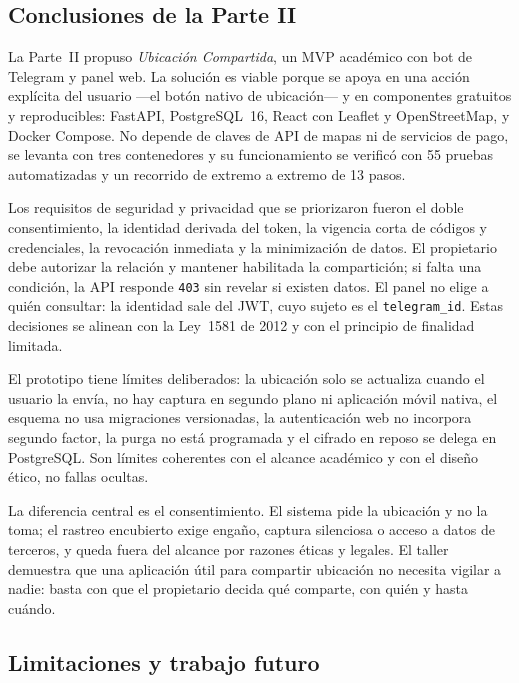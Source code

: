 \subsection{Conclusiones de la Parte II}

La Parte~II propuso \emph{Ubicación Compartida}, un MVP académico con bot de Telegram y panel web. La solución es viable porque se apoya en una acción explícita del usuario ---el botón nativo de ubicación--- y en componentes gratuitos y reproducibles: FastAPI, PostgreSQL~16, React con Leaflet y OpenStreetMap, y Docker Compose. No depende de claves de API de mapas ni de servicios de pago, se levanta con tres contenedores y su funcionamiento se verificó con 55 pruebas automatizadas y un recorrido de extremo a extremo de 13 pasos.

Los requisitos de seguridad y privacidad que se priorizaron fueron el doble consentimiento, la identidad derivada del token, la vigencia corta de códigos y credenciales, la revocación inmediata y la minimización de datos. El propietario debe autorizar la relación y mantener habilitada la compartición; si falta una condición, la API responde \texttt{403} sin revelar si existen datos. El panel no elige a quién consultar: la identidad sale del JWT, cuyo sujeto es el \texttt{telegram\_id}. Estas decisiones se alinean con la Ley~1581 de 2012 y con el principio de finalidad limitada.

El prototipo tiene límites deliberados: la ubicación solo se actualiza cuando el usuario la envía, no hay captura en segundo plano ni aplicación móvil nativa, el esquema no usa migraciones versionadas, la autenticación web no incorpora segundo factor, la purga no está programada y el cifrado en reposo se delega en PostgreSQL. Son límites coherentes con el alcance académico y con el diseño ético, no fallas ocultas.

La diferencia central es el consentimiento. El sistema pide la ubicación y no la toma; el rastreo encubierto exige engaño, captura silenciosa o acceso a datos de terceros, y queda fuera del alcance por razones éticas y legales. El taller demuestra que una aplicación útil para compartir ubicación no necesita vigilar a nadie: basta con que el propietario decida qué comparte, con quién y hasta cuándo.

\subsection{Limitaciones y trabajo futuro}

